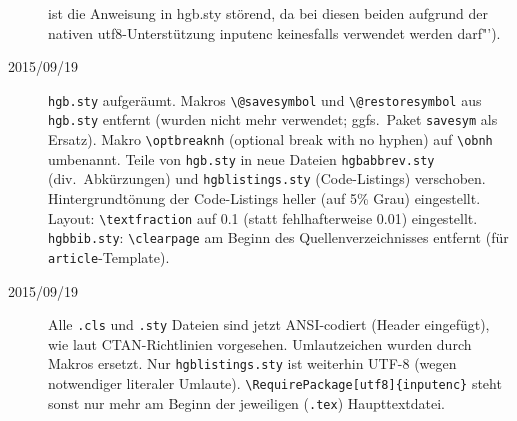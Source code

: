 \begin{sloppypar}
\begin{description}
ist die Anweisung in hgb.sty störend, da bei diesen beiden aufgrund der nativen utf8-Unterstützung inputenc 
keinesfalls verwendet werden darf"').
\item[2015/09/19]
\texttt{hgb.sty} aufgeräumt.
Makros \verb!\@savesymbol! und \verb!\@restoresymbol! aus \texttt{hgb.sty} entfernt
(wurden nicht mehr verwendet; ggfs.\ Paket \texttt{savesym} als Ersatz).
Makro \verb!\optbreaknh! (optional break with no hyphen) auf \verb!\obnh! umbenannt.
Teile von \texttt{hgb.sty} in neue Dateien \texttt{hgbabbrev.sty} (div.\ Abkürzungen)
und \texttt{hgblistings.sty} (Code-Listings) verschoben.
Hintergrundtönung der Code-Listings heller (auf 5\% Grau) eingestellt.
Layout: \verb!\textfraction! auf 0.1 (statt fehlhafterweise 0.01) eingestellt.
\texttt{hgbbib.sty}: \verb!\clearpage! am Beginn des Quellenverzeichnisses entfernt
(für \texttt{article}-Template).
\item[2015/09/19]
Alle \texttt{.cls} und \texttt{.sty} Dateien sind jetzt ANSI-codiert (Header eingefügt), wie
laut CTAN-Richtlinien vorgesehen. Umlautzeichen wurden durch Makros ersetzt.
Nur \texttt{hgblistings.sty} ist weiterhin UTF-8 (wegen notwendiger literaler Umlaute).
\verb!\RequirePackage[utf8]{inputenc}! steht sonst nur mehr am Beginn
der jeweiligen (\texttt{.tex}) Haupttextdatei.
\end{description}

\end{sloppypar}









